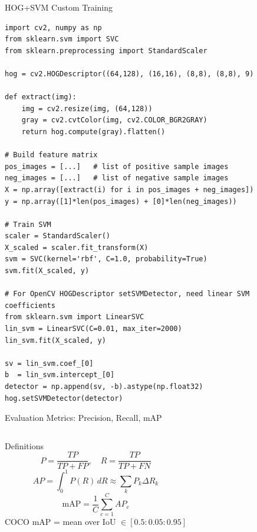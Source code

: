 \documentclass[aspectratio=169]{beamer}
\begin{document}
\begin{frame}[fragile]{HOG+SVM Custom Training}
\begin{lstlisting}
import cv2, numpy as np
from sklearn.svm import SVC
from sklearn.preprocessing import StandardScaler

hog = cv2.HOGDescriptor((64,128), (16,16), (8,8), (8,8), 9)

def extract(img):
    img = cv2.resize(img, (64,128))
    gray = cv2.cvtColor(img, cv2.COLOR_BGR2GRAY)
    return hog.compute(gray).flatten()

# Build feature matrix
pos_images = [...]   # list of positive sample images
neg_images = [...]   # list of negative sample images
X = np.array([extract(i) for i in pos_images + neg_images])
y = np.array([1]*len(pos_images) + [0]*len(neg_images))

# Train SVM
scaler = StandardScaler()
X_scaled = scaler.fit_transform(X)
svm = SVC(kernel='rbf', C=1.0, probability=True)
svm.fit(X_scaled, y)

# For OpenCV HOGDescriptor setSVMDetector, need linear SVM coefficients
from sklearn.svm import LinearSVC
lin_svm = LinearSVC(C=0.01, max_iter=2000)
lin_svm.fit(X_scaled, y)

sv = lin_svm.coef_[0]
b  = lin_svm.intercept_[0]
detector = np.append(sv, -b).astype(np.float32)
hog.setSVMDetector(detector)
\end{lstlisting}
\end{frame}

\begin{frame}{Evaluation Metrics: Precision, Recall, mAP}
  \begin{columns}
    \begin{block}{Definitions}
      \[
        P = \frac{TP}{TP+FP}, \quad R = \frac{TP}{TP+FN}
      \]
      \[
        AP = \int_0^1 P(R)\,dR \approx \sum_k P_k \Delta R_k
      \]
      \[
        \text{mAP} = \frac{1}{C}\sum_{c=1}^{C} AP_c
      \]
      COCO mAP = mean over IoU $\in [0.5:0.05:0.95]$
    \end{block}
  \end{columns}
\end{frame}
\end{document}

